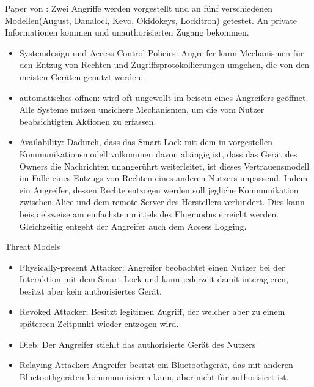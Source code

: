 	Paper von \citeauthor{Ho2016}:
	Zwei Angriffe werden vorgestellt und an fünf verschiedenen Modellen(August, Danalocl, Kevo, Okidokeys, Lockitron) getestet.
	An private Informationen kommen und unauthorisierten Zugang bekommen.
	\begin{itemize}
	    \item Systemdesign und Access Control Policies: Angreifer kann Mechanismen für den Entzug von Rechten und Zugriffsprotokollierungen umgehen, die von den meisten Geräten genutzt werden.
	    \item automatisches öffnen: wird oft ungewollt im beisein eines Angreifers geöffnet. 
	        Alle Systeme nutzen unsichere Mechanismen, um die vom Nutzer beabsichtigten Aktionen zu erfassen.
        \item Availability: Dadurch, dass das Smart Lock mit dem in  vorgestellen Kommunikationsmodell volkommen davon abängig ist, dass das Gerät des Owners die Nachrichten unangerührt weiterleitet, ist dieses Vertrauensmodell im Falle eines Entzugs von Rechten eines anderen Nutzers unpassend.
            Indem ein Angreifer, dessen Rechte entzogen werden soll jegliche Kommunikation zwischen Alice und dem remote Server des Herstellers verhindert.
            Dies kann beispielsweise am einfachsten mittels des Flugmodus erreicht werden.
            Gleichzeitig entgeht der Angreifer auch dem Access Logging.

	\end{itemize}
	
	Threat Models
	\begin{itemize}
	    \item Physically-present Attacker: Angreifer beobachtet einen Nutzer bei der Interaktion mit dem Smart Lock und kann jederzeit damit interagieren, besitzt aber kein authorisiertes Gerät.
		\item Revoked Attacker: Besitzt legitimen Zugriff, der welcher aber zu einem spätereen Zeitpunkt wieder entzogen wird.
		\item Dieb: Der Angreifer stiehlt das authorisierte Gerät des Nutzers
		\item Relaying Attacker: Angreifer besitzt ein Bluetoothgerät, das mit anderen Bluetoothgeräten kommmunizieren kann, aber nicht für authorisiert ist.
	\end{itemize}
	
